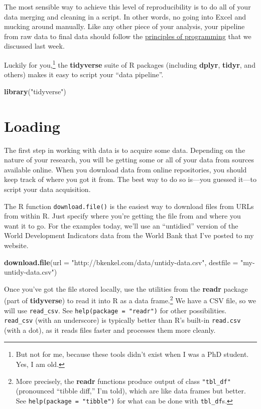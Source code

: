 \documentclass[12pt,oneside,openany]{book}
\newenvironment{Shaded}{\begin{snugshade}}{\end{snugshade}}
\newcommand{\KeywordTok}[1]{\textcolor[rgb]{0.13,0.29,0.53}{\textbf{#1}}}
\newcommand{\DataTypeTok}[1]{\textcolor[rgb]{0.13,0.29,0.53}{#1}}
\newcommand{\StringTok}[1]{\textcolor[rgb]{0.31,0.60,0.02}{#1}}
\newcommand{\NormalTok}[1]{#1}
\begin{document}
The most sensible way to achieve this level of reproducibility is to do
all of your data merging and cleaning in a script. In other words, no
going into Excel and mucking around manually. Like any other piece of
your analysis, your pipeline from raw data to final data should follow
the \protect\hyperlink{programming}{principles of programming} that we
discussed last week.

Luckily for you,\footnote{But not for me, because these tools didn't
  exist when I was a PhD student. Yes, I am old.} the \textbf{tidyverse}
suite of R packages (including \textbf{dplyr}, \textbf{tidyr}, and
others) makes it easy to script your ``data pipeline''.

\begin{Shaded}
\begin{Highlighting}[]
\KeywordTok{library}\NormalTok{(}\StringTok{"tidyverse"}\NormalTok{)}
\end{Highlighting}
\end{Shaded}

\section{Loading}\label{loading}

The first step in working with data is to acquire some data. Depending
on the nature of your research, you will be getting some or all of your
data from sources available online. When you download data from online
repositories, you should keep track of where you got it from. The best
way to do so is---you guessed it---to script your data acquisition.

The R function \texttt{download.file()} is the easiest way to download
files from URLs from within R. Just specify where you're getting the
file from and where you want it to go. For the examples today, we'll use
an ``untidied'' version of the World Development Indicators data from
the World Bank that I've posted to my website.

\begin{Shaded}
\begin{Highlighting}[]
\KeywordTok{download.file}\NormalTok{(}\DataTypeTok{url =} \StringTok{"http://bkenkel.com/data/untidy-data.csv"}\NormalTok{,}
              \DataTypeTok{destfile =} \StringTok{"my-untidy-data.csv"}\NormalTok{)}
\end{Highlighting}
\end{Shaded}

Once you've got the file stored locally, use the utilities from the
\textbf{readr} package (part of \textbf{tidyverse}) to read it into R as
a data frame.\footnote{More precisely, the \textbf{readr} functions
  produce output of class \texttt{"tbl\_df"} (pronounced ``tibble
  diff,'' I'm told), which are like data frames but better. See
  \texttt{help(package\ =\ "tibble")} for what can be done with
  \texttt{tbl\_df}s.} We have a CSV file, so we will use
\texttt{read\_csv}. See \texttt{help(package\ =\ "readr")} for other
possibilities. \texttt{read\_csv} (with an underscore) is typically
better than R's built-in \texttt{read.csv} (with a dot), as it reads
files faster and processes them more cleanly.
\end{document}
